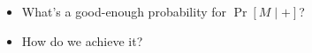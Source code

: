 \begin{exercise}
  \begin{itemize}
    \item What's a good-enough probability for \(\Pr[M\mid +]\)?
    \item How do we achieve it?
  \end{itemize}
\end{exercise}


